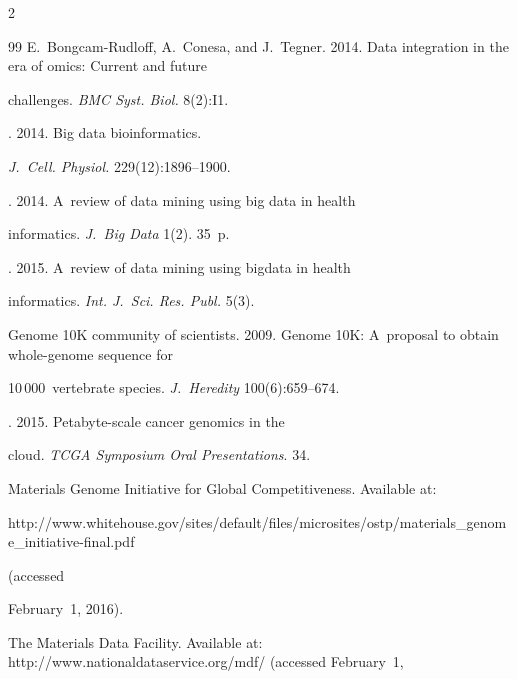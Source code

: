 \begin{multicols}{2}
{{\begin{thebibliography}{99}
{E.~Bongcam-Rudloff, A.~Conesa, and J.~Tegner}. 2014. Data integration in the era of omics: Current and future 


challenges. \textit{BMC Syst. Biol.} 8(2):I1.




. 2014. Big data bioinformatics. 


\textit{J.~Cell. Physiol.} 229(12):1896--1900.







. 2014. A~review of data mining using big data in health 


informatics. \textit{J.~Big Data} 1(2).  35~p.




. 2015. A~review of data mining using bigdata in health 


informatics. \textit{Int. J.~Sci. Res. Publ.} 5(3).







Genome 10K community of scientists. 2009. Genome 10K: A~proposal to obtain whole-genome sequence for 


10\,000~vertebrate species. \textit{J.~Heredity} 100(6):659--674.




. 2015. Petabyte-scale cancer genomics in the 


cloud. \textit{TCGA Symposium Oral Presentations}. 34.




Materials Genome Initiative for Global Competitiveness. Available at: {\sf 


http://www.whitehouse.gov/sites/\linebreak default/files/microsites/ostp/materials\_genome\_initiati\linebreak ve-final.pdf} (accessed 


February~1, 2016).




The Materials Data Facility. Available at: {\sf http://www.\linebreak nationaldataservice.org/mdf/} (accessed February~1, 



\end{thebibliography}}}
\end{multicols}
